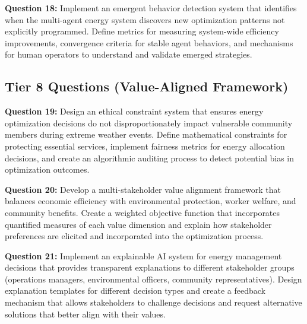 \documentclass{article}
\begin{document}
\textbf{Question 18:} Implement an emergent behavior detection system that identifies when the multi-agent energy system discovers new optimization patterns not explicitly programmed. Define metrics for measuring system-wide efficiency improvements, convergence criteria for stable agent behaviors, and mechanisms for human operators to understand and validate emerged strategies.

\subsection{Tier 8 Questions (Value-Aligned Framework)}

\textbf{Question 19:} Design an ethical constraint system that ensures energy optimization decisions do not disproportionately impact vulnerable community members during extreme weather events. Define mathematical constraints for protecting essential services, implement fairness metrics for energy allocation decisions, and create an algorithmic auditing process to detect potential bias in optimization outcomes.

\textbf{Question 20:} Develop a multi-stakeholder value alignment framework that balances economic efficiency with environmental protection, worker welfare, and community benefits. Create a weighted objective function that incorporates quantified measures of each value dimension and explain how stakeholder preferences are elicited and incorporated into the optimization process.

\textbf{Question 21:} Implement an explainable AI system for energy management decisions that provides transparent explanations to different stakeholder groups (operations managers, environmental officers, community representatives). Design explanation templates for different decision types and create a feedback mechanism that allows stakeholders to challenge decisions and request alternative solutions that better align with their values.
\end{document}

